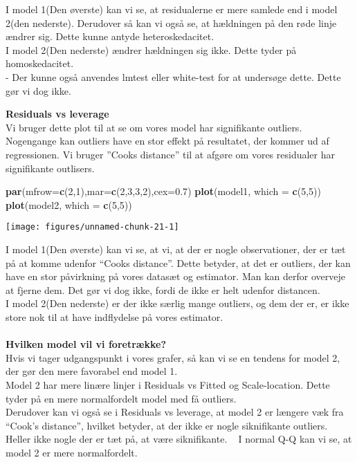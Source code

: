 \documentclass[
  10pt,
]{article}
\newenvironment{Shaded}{\begin{snugshade}}{\end{snugshade}}
\newcommand{\DataTypeTok}[1]{\textcolor[rgb]{0.13,0.29,0.53}{#1}}
\newcommand{\DecValTok}[1]{\textcolor[rgb]{0.00,0.00,0.81}{#1}}
\newcommand{\FloatTok}[1]{\textcolor[rgb]{0.00,0.00,0.81}{#1}}
\newcommand{\KeywordTok}[1]{\textcolor[rgb]{0.13,0.29,0.53}{\textbf{#1}}}
\newcommand{\NormalTok}[1]{#1}
\begin{document}
I model 1(Den øverste) kan vi se, at residualerne er mere samlede end i
model 2(den nederste). Derudover så kan vi også se, at hældningen på den
røde linje ændrer sig. Dette kunne antyde heteroskedacitet.\\
I model 2(Den nederste) ændrer hældningen sig ikke. Dette tyder på
homoskedacitet.\\
- Der kunne også anvendes lmtest eller white-test for at undersøge
dette. Dette gør vi dog ikke. \newpage

\textbf{Residuals vs leverage}\\
Vi bruger dette plot til at se om vores model har signifikante outliers.
Nogengange kan outliers have en stor effekt på resultatet, der kommer ud
af regressionen. Vi bruger ''Cooks distance'' til at afgøre om vores
residualer har signifikante outlisers.

\begin{Shaded}
\begin{Highlighting}[]
\KeywordTok{par}\NormalTok{(}\DataTypeTok{mfrow=}\KeywordTok{c}\NormalTok{(}\DecValTok{2}\NormalTok{,}\DecValTok{1}\NormalTok{),}\DataTypeTok{mar=}\KeywordTok{c}\NormalTok{(}\DecValTok{2}\NormalTok{,}\DecValTok{3}\NormalTok{,}\DecValTok{3}\NormalTok{,}\DecValTok{2}\NormalTok{),}\DataTypeTok{cex=}\FloatTok{0.7}\NormalTok{)}
\KeywordTok{plot}\NormalTok{(model1, }\DataTypeTok{which =} \KeywordTok{c}\NormalTok{(}\DecValTok{5}\NormalTok{,}\DecValTok{5}\NormalTok{))}
\KeywordTok{plot}\NormalTok{(model2, }\DataTypeTok{which =} \KeywordTok{c}\NormalTok{(}\DecValTok{5}\NormalTok{,}\DecValTok{5}\NormalTok{))}
\end{Highlighting}
\end{Shaded}

\begin{center}\texttt{[image: figures/unnamed-chunk-21-1]} \end{center}

I model 1(Den øverste) kan vi se, at vi, at der er nogle observationer,
der er tæt på at komme udenfor ``Cooks distance''. Dette betyder, at det
er outliers, der kan have en stor påvirkning på vores datasæt og
estimator. Man kan derfor overveje at fjerne dem. Det gør vi dog ikke,
fordi de ikke er helt udenfor distancen.\\
I model 2(Den nederste) er der ikke særlig mange outliers, og dem der
er, er ikke store nok til at have indflydelse på vores estimator.\\
~\\
\textbf{Hvilken model vil vi foretrække?}\\
Hvis vi tager udgangspunkt i vores grafer, så kan vi se en tendens for
model 2, der gør den mere favorabel end model 1.\\
Model 2 har mere linære linjer i Residuals vs Fitted og Scale-location.
Dette tyder på en mere normalfordelt model med få outliers.\\
Derudover kan vi også se i Residuals vs leverage, at model 2 er længere
væk fra ``Cook's distance'', hvilket betyder, at der ikke er nogle
siknifikante outliers. Heller ikke nogle der er tæt på, at være
siknifikante. ~ I normal Q-Q kan vi se, at model 2 er mere
normalfordelt. \newpage
\end{document}
